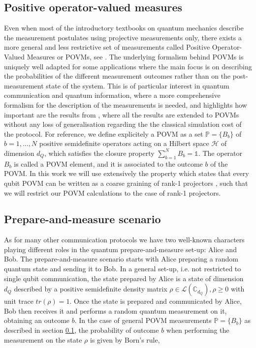 \subsection{Positive operator-valued measures}\label{section:povms}
Even when most of the introductory textbooks on quantum mechanics describe the measurement postulates using projective measurements only, there exists a more general and less restrictive set of measurements called Positive Operator-Valued Measures or POVMs, see \cite{nielsen2000}\cite{peres1995}. The underlying formalism behind POVMs is uniquely well adapted for some applications where the main focus is on describing the probabilities of the different measurement outcomes rather than on the post-measurement state of the system. This is of particular interest in quantum communication and quantum information, where a more comprehensive formalism for the description of the measurements is needed, and highlights how important are the results from \cite{renner2022}, where all the results are extended to POVMs without any loss of generalisation regarding the the classical simulation cost of the protocol. For reference, we define explicitely a POVM as a set $\mathbb P=\{B_b\}$ of $b=1,...,N$ positive semidefinite operators acting on a Hilbert space $\mathcal{H}$ of dimension $d_{Q}$, which satisfies the closure property $\sum_{b=1}^{N} B_{b} = \mathbb{1}$. The operator $B_{b}$ is called a POVM element, and it is associated to the outcome $b$ of the POVM. In this work we will use extensively the property which states that every qubit POVM can be written as a coarse graining of rank-1 projectors \cite{barrett2002}, such that we will restrict our POVM calculations to the case of rank-1 projectors.

\subsection{Prepare-and-measure scenario}\label{section:pm}
As for many other communication protocols we have two well-known characters playing different roles in the quantum prepare-and-measure set-up: Alice and Bob. The prepare-and-measure scenario starts with Alice preparing a random quantum state and sending it to Bob. In a general set-up, i.e. not restricted to single qubit communication, the state prepared by Alice is a state of dimension $d_Q$ described by a positive semidefinite density matrix $\rho \in \mathcal{L}( \mathbb{C}_{d_Q}), \rho \ge 0$ with unit trace $tr(\rho)=1$. Once the state is prepared and communicated by Alice, Bob then receives it and performs a random quantum measurement on it, obtaining an outcome $b$. In the case of general POVM measurements $\mathbb P=\{B_b\}$ as described in section \ref{section:povms}, the probability of outcome $b$ when performing the measurement on the state $\rho$ is given by Born's rule,

